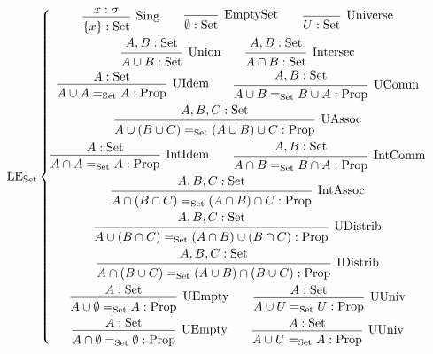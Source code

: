 \documentclass[]{article}
\newcommand{\1}{\mathbbm{1}}
\newcommand{\0}{\mathbbm{0}}
\newcommand{\Prop}{\text{Prop}}
\newcommand{\Set}{\text{Set}}
\newcommand{\proof}[1]{{\scantokens{\begin{prooftree}#1\end{prooftree}}}}
\begin{document}
\[\text{LE}_\text{Set}\left\{
    \begin{gathered}
        \proof{
            \hypo{x:\sigma}
            \infer1[Sing]{\{x\} : \Set}
        }
        \qquad\proof{
            \infer0[EmptySet]{\emptyset : \Set}
        }
        \qquad\proof{
            \infer0[Universe]{U : \Set}
        }\\
        \proof{
            \hypo{A, B : \Set}
            \infer1[Union]{A\cup B : \Set}
        }
        \qquad\proof{
            \hypo{A, B : \Set}
            \infer1[Intersec]{A\cap B: \Set}
        }\\
        \proof{
            \hypo{A : \Set}
            \infer1[UIdem]{A\cup A =_{\Set} A : \Prop}
        }
        \qquad\proof{
            \hypo{A, B : \Set}
            \infer1[UComm]{A\cup B =_{\Set} B\cup A : \Prop}
        }\\
        \proof{
            \hypo{A, B, C : \Set}
            \infer1[UAssoc]{A\cup (B\cup C) =_{\Set} (A\cup B)\cup C : \Prop}
        }\\
        \proof{
            \hypo{A : \Set}
            \infer1[IntIdem]{A\cap A =_{\Set} A : \Prop}
        }
        \qquad\proof{
            \hypo{A, B : \Set}
            \infer1[IntComm]{A\cap B =_{\Set} B\cap A : \Prop}
        }\\
        \proof{
            \hypo{A, B, C : \Set}
            \infer1[IntAssoc]{A\cap (B\cap C) =_{\Set} (A\cap B)\cap C : \Prop}
        }\\
        \proof{
            \hypo{A, B, C : \Set}
            \infer1[UDistrib]{A\cup (B\cap C) =_{\Set}
                              (A\cap B) \cup (B\cap C) : \Prop}
        }\\
        \proof{
            \hypo{A, B, C : \Set}
            \infer1[IDistrib]{A\cap (B\cup C) =_{\Set}
                              (A\cup B) \cap (B\cup C) : \Prop}
        }\\
        \proof{
            \hypo{A : \Set}
            \infer1[UEmpty]{A\cup \emptyset =_{\Set} A : \Prop}
        }
        \qquad\proof{
            \hypo{A : \Set}
            \infer1[UUniv]{A\cup U =_{\Set} U : \Prop}
        }\\
        \proof{
            \hypo{A : \Set}
            \infer1[UEmpty]{A\cap \emptyset =_{\Set}
                            \emptyset : \Prop}
        }
        \qquad\proof{
            \hypo{A : \Set}
            \infer1[UUniv]{A\cup U =_{\Set} A : \Prop}
        }\\
    \end{gathered}
\right.\]
\end{document}
